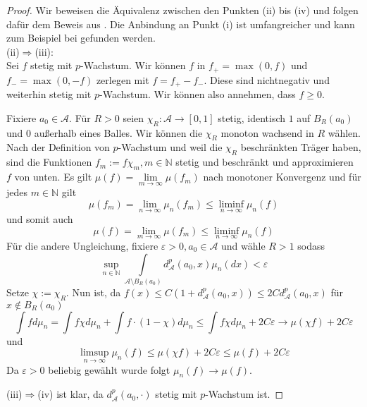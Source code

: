 \begin{proof}
Wir beweisen die Äquivalenz zwischen den Punkten (ii) bis (iv) und folgen dafür dem Beweis aus \cite[Proposition 2.4]{Ambrosio2013AUG}. Die Anbindung an Punkt (i) ist umfangreicher und kann zum Beispiel bei \cite[Satz 6.9]{villani} gefunden werden. \\ 

(ii)$\Rightarrow$(iii): \\
Sei $f$ stetig mit $p$-Wachstum. Wir können $f$ in $f_+ = \max(0, f)$ und $f_-=\max(0, -f)$ zerlegen mit $f=f_+-f_-$. Diese sind nichtnegativ und weiterhin stetig mit $p$-Wachstum. Wir können also annehmen, dass $f\geq 0$. 

Fixiere $a_0 \in \mathcal{A}$. Für $R>0$ seien $\chi_R:\mathcal{A}\rightarrow[0,1]$ stetig, identisch $1$ auf $B_R(a_0)$ und $0$ außerhalb eines Balles. Wir können die $\chi_R$ monoton wachsend in $R$ wählen. Nach der Definition von $p$-Wachstum und weil die $\chi_R$ beschränkten Träger haben, sind die Funktionen $f_m := f\chi_m, m\in \mathbb{N}$ stetig und beschränkt und approximieren $f$ von unten. Es gilt $\mu(f) = \lim\limits_{m\rightarrow \infty} \mu(f_m)$ nach monotoner Konvergenz und für jedes $m \in \mathbb{N}$ gilt 
$$\mu(f_m) = \lim\limits_{n\rightarrow\infty}\mu_n(f_m) \leq \liminf\limits_{n\rightarrow\infty}\mu_n(f)$$
und somit auch 
$$\mu(f) = \lim_{m\rightarrow\infty} \mu(f_m) \leq \liminf\limits_{n\rightarrow\infty}\mu_n(f)$$
Für die andere Ungleichung, fixiere $\varepsilon>0, a_0 \in \mathcal{A}$ und wähle $R>1$ sodass
$$\sup\limits_{n \in \mathbb{N}} \int\limits_{\mathcal{A}\setminus B_R(a_0)}d_\mathcal{A}^p(a_0, x)\mu_n(dx) < \varepsilon$$
Setze $\chi:=\chi_R$.
Nun ist, da $f(x)\leq C(1+d_\mathcal{A}^p(a_0, x)) \leq 2Cd_\mathcal{A}^p(a_0, x)$ für  $x\notin B_R(a_0)$ 
$$\int fd\mu_n = \int f\chi d\mu_n + \int f\cdot(1-\chi)d\mu_n \leq \int f\chi d\mu_n + 2C\varepsilon \rightarrow \mu(\chi f) + 2C\varepsilon$$
und 
$$\limsup_{n\rightarrow\infty}\mu_n(f) \leq \mu(\chi f) + 2C\varepsilon \leq \mu(f) + 2C\varepsilon$$
Da $\varepsilon>0$ beliebig gewählt wurde folgt $\mu_n(f) \rightarrow \mu(f)$.

(iii)$\Rightarrow$(iv) ist klar, da $d^p_\mathcal{A}(a_0, \cdot)$ stetig mit $p$-Wachstum ist.


\end{proof}
